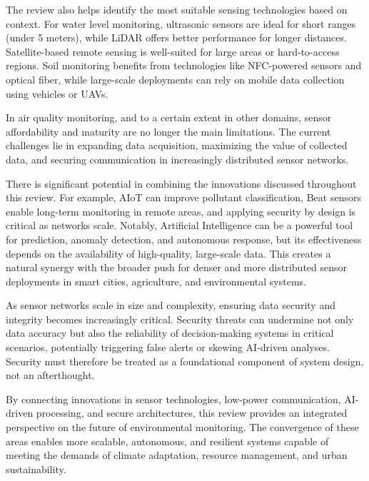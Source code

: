 \documentclass[conference]{IEEEtran}
\begin{document}
The review also helps identify the most suitable sensing technologies based on context. For water level monitoring, ultrasonic sensors are ideal for short ranges (under 5 meters), while LiDAR offers better performance for longer distances. Satellite-based remote sensing is well-suited for large areas or hard-to-access regions. Soil monitoring benefits from technologies like NFC-powered sensors and optical fiber, while large-scale deployments can rely on mobile data collection using vehicles or UAVs.

In air quality monitoring, and to a certain extent in other domains, sensor affordability and maturity are no longer the main limitations. The current challenges lie in expanding data acquisition, maximizing the value of collected data, and securing communication in increasingly distributed sensor networks.

There is significant potential in combining the innovations discussed throughout this review. For example, AIoT can improve pollutant classification, Beat sensors enable long-term monitoring in remote areas, and applying security by design is critical as networks scale. Notably, Artificial Intelligence can be a powerful tool for prediction, anomaly detection, and autonomous response, but its effectiveness depends on the availability of high-quality, large-scale data. This creates a natural synergy with the broader push for denser and more distributed sensor deployments in smart cities, agriculture, and environmental systems.

As sensor networks scale in size and complexity, ensuring data security and integrity becomes increasingly critical. Security threats can undermine not only data accuracy but also the reliability of decision-making systems in critical scenarios, potentially triggering false alerts or skewing AI-driven analyses. Security must therefore be treated as a foundational component of system design, not an afterthought.

By connecting innovations in sensor technologies, low-power communication, AI-driven processing, and secure architectures, this review provides an integrated perspective on the future of environmental monitoring. The convergence of these areas enables more scalable, autonomous, and resilient systems capable of meeting the demands of climate adaptation, resource management, and urban sustainability.
\end{document}

